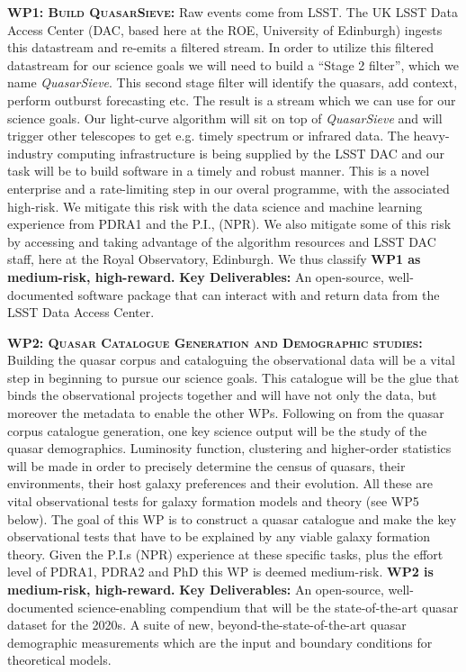 \documentclass[oneside, a4paper, onecolumn, 11pt]{article}
\begin{document}
\smallskip
\smallskip
\noindent
\textbf{\textsc{WP1: Build QuasarSieve:}} 
Raw events come from LSST. The UK LSST Data Access Center (DAC, based
here at the ROE, University of Edinburgh) ingests this datastream and
re-emits a filtered stream. In order to utilize this filtered datastream for
our science goals we will need to build a ``Stage 2 filter'', which we
name {\it QuasarSieve}.  This second stage filter will identify the
quasars, add context, perform outburst forecasting etc.  The
result is a stream which we can use for our science goals.  Our
light-curve algorithm will sit on top of {\it QuasarSieve} and will
trigger other telescopes to get e.g. timely spectrum or infrared data. 
The heavy-industry computing infrastructure is being supplied by the
LSST DAC and our task will be to build software in a
timely and robust manner.  This is a novel enterprise and a
rate-limiting step in our overal programme, with the associated
high-risk.  We mitigate this risk with the data science and machine
learning experience from PDRA1 and the P.I., (NPR).  We also mitigate
some of this risk by accessing and taking advantage of the algorithm
resources and LSST DAC staff,
here at the Royal Observatory, Edinburgh. 
We thus classify {\bf WP1 as medium-risk, high-reward.}  
 {\bf Key Deliverables:} An
open-source, well-documented software package that can interact with
and return data from the LSST Data Access Center.


\smallskip
\smallskip
\noindent
\textbf{\textsc{WP2: Quasar Catalogue Generation and Demographic studies:}}  
Building the quasar corpus and cataloguing the observational data will
be a vital step in beginning to pursue our science goals. This
catalogue will be the glue that binds the observational projects
together and will have not only the data, but moreover the metadata to
enable the other WPs.  Following on from the quasar corpus catalogue
generation, one key science output will be the study of the quasar
demographics.  Luminosity function, clustering and higher-order
statistics will be made in order to precisely determine the census of
quasars, their environments, their host galaxy preferences and their
evolution. All these are vital observational tests for galaxy
formation models and theory (see WP5 below).
The goal of this WP is to construct a quasar catalogue and make the
key observational tests that have to be explained by any viable galaxy
formation theory.
Given the P.I.s (NPR) experience at these specific tasks, plus the
effort level of PDRA1, PDRA2 and PhD this WP is deemed medium-risk.
{\bf WP2 is medium-risk, high-reward.}
{\bf Key Deliverables:} An open-source, well-documented science-enabling compendium that
will be the state-of-the-art quasar dataset for the 2020s.  A suite of new, beyond-the-state-of-the-art 
quasar demographic measurements which are the input 
and boundary conditions for theoretical models. 
\end{document}

